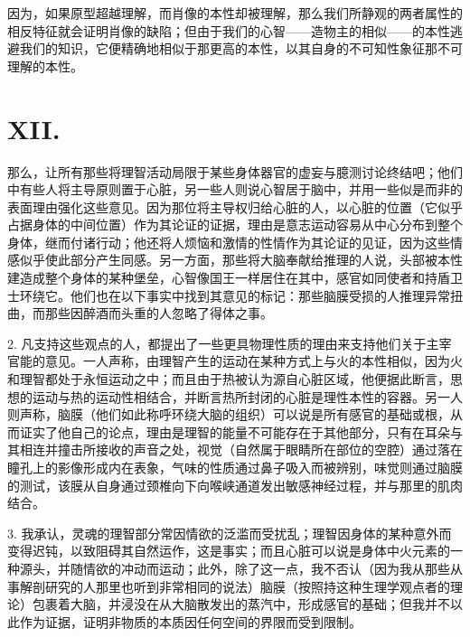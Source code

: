 因为，如果原型超越理解，而肖像的本性却被理解，那么我们所静观的两者属性的相反特征就会证明肖像的缺陷；但由于我们的心智——造物主的相似——的本性逃避我们的知识，它便精确地相似于那更高的本性，以其自身的不可知性象征那不可理解的本性。\par


\section{XII. }

那么，让所有那些将理智活动局限于某些身体器官的虚妄与臆测讨论终结吧；他们中有些人将主导原则置于心脏，另一些人则说心智居于脑中，并用一些似是而非的表面理由强化这些意见。因为那位将主导权归给心脏的人，以心脏的位置（它似乎占据身体的中间位置）作为其论证的证据，理由是意志运动容易从中心分布到整个身体，继而付诸行动；他还将人烦恼和激情的性情作为其论证的见证，因为这些情感似乎使此部分产生同感。另一方面，那些将大脑奉献给推理的人说，头部被本性建造成整个身体的某种堡垒，心智像国王一样居住在其中，感官如同使者和持盾卫士环绕它。他们也在以下事实中找到其意见的标记：那些脑膜受损的人推理异常扭曲，而那些因醉酒而头重的人忽略了得体之事。\par

2. 凡支持这些观点的人，都提出了一些更具物理性质的理由来支持他们关于主宰官能的意见。一人声称，由理智产生的运动在某种方式上与火的本性相似，因为火和理智都处于永恒运动之中；而且由于热被认为源自心脏区域，他便据此断言，思想的运动与热的运动性相结合，并断言热所封闭的心脏是理性本性的容器。另一人则声称，脑膜（他们如此称呼环绕大脑的组织）可以说是所有感官的基础或根，从而证实了他自己的论点，理由是理智的能量不可能存在于其他部分，只有在耳朵与其相连并撞击所接收的声音之处，视觉（自然属于眼睛所在部位的空腔）通过落在瞳孔上的影像形成内在表象，气味的性质通过鼻子吸入而被辨别，味觉则通过脑膜的测试，该膜从自身通过颈椎向下向喉峡通道发出敏感神经过程，并与那里的肌肉结合。\par

3. 我承认，灵魂的理智部分常因情欲的泛滥而受扰乱；理智因身体的某种意外而变得迟钝，以致阻碍其自然运作，这是事实；而且心脏可以说是身体中火元素的一种源头，并随情欲的冲动而运动；此外，除了这一点，我不否认（因为我从那些从事解剖研究的人那里也听到非常相同的说法）脑膜（按照持这种生理学观点者的理论）包裹着大脑，并浸没在从大脑散发出的蒸汽中，形成感官的基础；但我并不以此作为证据，证明非物质的本质因任何空间的界限而受到限制。\par


